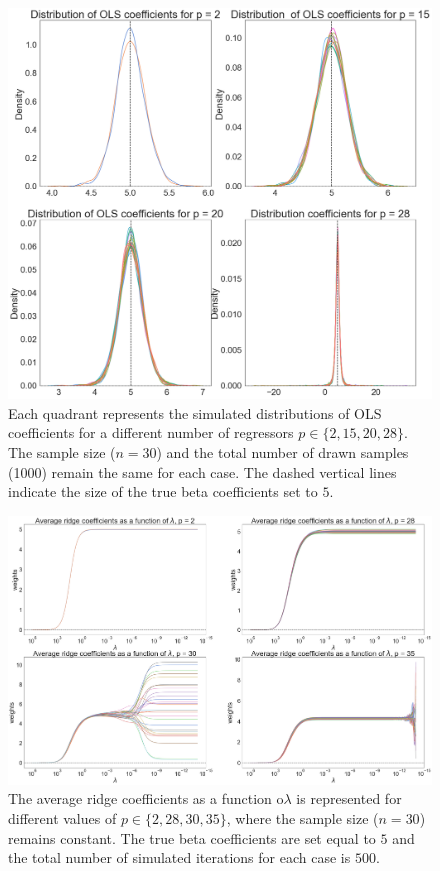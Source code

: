 \begin{figure}[H]
\includegraphics[scale=0.3]{material/Img/ols_distr.png}
\centering
\caption[Distribution of OLS coefficients]{Each quadrant represents the simulated distributions of OLS coefficients for a different number of regressors $p\in \{2,15,20,28\}$. The sample size ($n = 30$) and the total number of drawn samples (1000) remain the same for each case. The dashed vertical lines indicate the size of the true beta coefficients set to $5$.}
\label{fig:old_distr}
\end{figure}

\begin{figure}[H]
    \includegraphics[scale=0.2]{material/Img/average_ridge_plot_betas.png}
    \centering
    \caption[Average ridge coefficients as a function o$\lambda$]{The average ridge coefficients as a function o$\lambda$ is represented for different values of $p\in \{2,28,30,35\}$, where the sample size ($n=30$) remains constant. The true beta coefficients are set equal to $5$ and the total number of simulated iterations for each case is $500$.}
\label{fig:avg_ridge_betas}
\end{figure}
    
